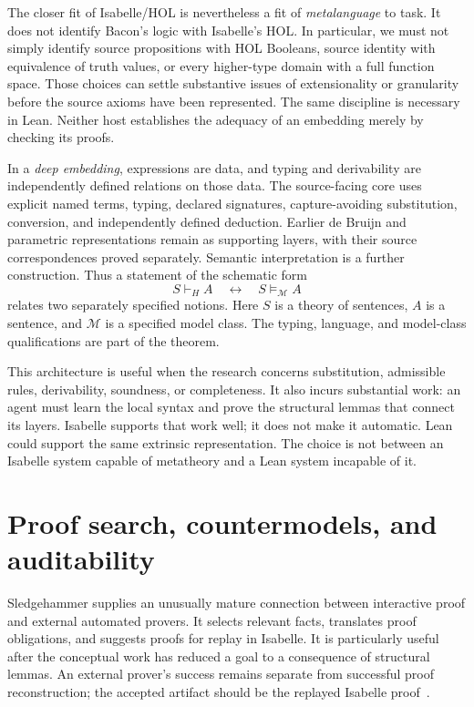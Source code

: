 \documentclass[12pt,leqno]{article}
\newcommand{\IFF}{\ensuremath{\leftrightarrow}}
\begin{document}
The closer fit of Isabelle/HOL is nevertheless a fit of \emph{metalanguage}
to task. It does not identify Bacon's logic with Isabelle's HOL. In particular,
we must not simply identify source propositions with HOL Booleans, source
identity with equivalence of truth values, or every higher-type domain with
a full function space. Those choices can settle substantive issues of
extensionality or granularity before the source axioms have been represented.
The same discipline is necessary in Lean. Neither host establishes the
adequacy of an embedding merely by checking its proofs.

In a \emph{deep embedding}, expressions are data, and typing and derivability
are independently defined relations on those data. The source-facing core uses explicit named terms, typing, declared
signatures, capture-avoiding substitution, conversion, and independently
defined deduction. Earlier de Bruijn and parametric representations remain
as supporting layers, with their source correspondences proved separately.
Semantic interpretation is a further construction.
Thus a statement of the schematic form
\[
  S\vdash_H A \quad\IFF\quad S\models_{\mathcal M} A
\]
relates two separately specified notions. Here $S$ is a theory of sentences,
$A$ is a sentence, and $\mathcal M$ is a specified model class. The typing,
language, and model-class qualifications are part of the theorem.

This architecture is useful when the research concerns substitution,
admissible rules, derivability, soundness, or completeness. It also incurs
substantial work: an agent must learn the local syntax and prove the
structural lemmas that connect its layers. Isabelle supports that work well;
it does not make it automatic. Lean could support the same extrinsic
representation. The choice is not between an Isabelle system capable of
metatheory and a Lean system incapable of it.

\section{Proof search, countermodels, and auditability}

Sledgehammer supplies an unusually mature connection between interactive
proof and external automated provers. It selects relevant facts, translates
proof obligations, and suggests proofs for replay in Isabelle. It is
particularly useful after the conceptual work has reduced a goal to a
consequence of structural lemmas. An external prover's success remains
separate from successful proof reconstruction; the accepted artifact should
be the replayed Isabelle proof~\cite{sledgehammer}.
\end{document}
